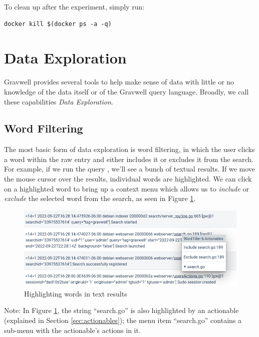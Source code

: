 To clean up after the experiment, simply run:

\begin{Verbatim}[breaklines=true]
docker kill $(docker ps -a -q)
\end{Verbatim}



\clearpage
\section{Data Exploration}
\label{sec:data-explorer}

Gravwell provides several tools to help make sense of data with little or no knowledge of the data itself or of the Gravwell query language. Broadly, we call these capabilities \emph{Data Exploration}.

\subsection{Word Filtering}
\label{sec:word-filtering}

The most basic form of data exploration is word filtering, in which the user clicks a word within the raw entry and either includes it or excludes it from the search. For example, if we run the query , we'll see a bunch of textual results. If we move the mouse cursor over the results, individual words are highlighted. We can click on a highlighted word to bring up a context menu which allows us to \emph{include} or \emph{exclude} the selected word from the search, as seen in Figure \ref{fig:words-highlight}.

\begin{figure}
	\includegraphics[width=0.8\linewidth]{images/words2.png}
	\caption{Highlighting words in text results}
	\label{fig:words-highlight}
\end{figure}

Note: In Figure \ref{fig:words-highlight}, the string ``search.go'' is also highlighted by an actionable (explained in Section \ref{sec:actionables}); the menu item ``search.go'' contains a sub-menu with the actionable's actions in it.

